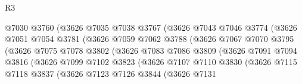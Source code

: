 \begin{lexlean}{R3}
\begin{coremodule}
                                @7030
                                @3760
                                (@3626
                                  @7035
                                  @7038
                                  @3767
                                  (@3626
                                    @7043
                                    @7046
                                    @3774
                                    (@3626
                                      @7051
                                      @7054
                                      @3781
                                      (@3626
                                        @7059
                                        @7062
                                        @3788
                                        (@3626
                                          @7067
                                          @7070
                                          @3795
                                          (@3626
                                            @7075
                                            @7078
                                            @3802
                                            (@3626
                                              @7083
                                              @7086
                                              @3809
                                              (@3626
                                                @7091
                                                @7094
                                                @3816
                                                (@3626
                                                  @7099
                                                  @7102
                                                  @3823
                                                  (@3626
                                                    @7107
                                                    @7110
                                                    @3830
                                                    (@3626
                                                      @7115
                                                      @7118
                                                      @3837
                                                      (@3626
                                                        @7123
                                                        @7126
                                                        @3844
                                                        (@3626
                                                          @7131

\end{coremodule}
\end{lexlean}
